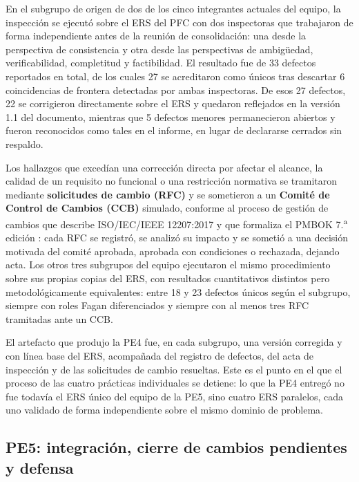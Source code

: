 \documentclass[journal,onecolumn]{IEEEtran}
\begin{document}
	En el subgrupo de origen de dos de los cinco integrantes actuales del equipo, la inspección
	se ejecutó sobre el ERS del PFC con dos inspectoras que trabajaron de forma independiente
	antes de la reunión de consolidación: una desde la perspectiva de consistencia y otra desde
	las perspectivas de ambigüedad, verificabilidad, completitud y factibilidad. El resultado
	fue de 33 defectos
	reportados en total, de los cuales 27 se acreditaron como únicos tras descartar 6
	coincidencias de frontera detectadas por ambas inspectoras. De esos 27 defectos, 22 se
	corrigieron directamente sobre el ERS y quedaron reflejados en la versión 1.1 del
	documento, mientras que 5 defectos menores permanecieron abiertos y fueron reconocidos como
	tales en el informe, en lugar de declararse cerrados sin respaldo. 
	
	Los hallazgos que excedían una corrección directa por afectar el alcance, la calidad de un requisito no
	funcional o una restricción normativa se tramitaron mediante \textbf{solicitudes de
		cambio (RFC)} y se sometieron a un \textbf{Comité de Control de Cambios (CCB)} simulado,
	conforme al proceso de gestión de cambios que describe ISO/IEC/IEEE 12207:2017
	\cite{iso12207} y que formaliza el PMBOK 7.\textsuperscript{a} edición \cite{pmbok7}: cada
	RFC se registró, se analizó su impacto y se sometió a una decisión motivada del comité
	aprobada, aprobada con condiciones o rechazada, dejando acta. Los otros tres subgrupos
	del equipo ejecutaron el mismo procedimiento sobre sus propias copias del ERS, con
	resultados cuantitativos distintos pero metodológicamente equivalentes: entre 18 y 23
	defectos únicos según el subgrupo, siempre con roles Fagan diferenciados y siempre con al
	menos tres RFC tramitadas ante un CCB.
	
	El artefacto que produjo la PE4 fue, en cada subgrupo, una versión corregida y con línea
	base del ERS, acompañada del registro de defectos, del acta de inspección y de las
	solicitudes de cambio resueltas. Este es el punto en el que el proceso de las cuatro
	prácticas individuales se detiene: lo que la PE4 entregó no fue todavía el ERS único del
	equipo de la PE5, sino cuatro ERS paralelos, cada uno validado de forma independiente sobre
	el mismo dominio de problema.
	
	\subsection{PE5: integración, cierre de cambios pendientes y defensa}
	
\end{document}
